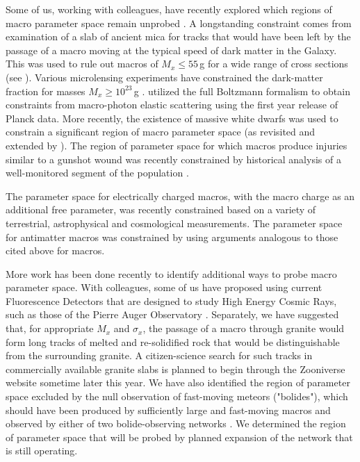 \documentclass[%
 reprint,
 amsmath,amssymb,
 aps,
]{revtex4-2}
\begin{document}
    Some of us, working with colleagues, have recently explored which regions of macro parameter space remain unprobed \cite{jacobs2015macro, jacobs2015resonant, Sidhu2019death, Sidhu2019bolide, Sidhu2020reconsider}. A longstanding constraint comes from examination of a slab of ancient mica for tracks that would have been left by the passage of a macro moving at the typical speed of dark matter in the Galaxy. This was used to rule out macros of $M_x \leq 55\,$g for a wide range of cross sections (see \cite{Price1988ge, DeRujula1984axn, jacobs2015macro}). Various microlensing experiments have constrained the dark-matter fraction  for masses $M_x \geq 10^{23}\,$g \cite{Alcock2001, Griest2013, Tisserand2007, Carr2010,Niikura2019}. \citeauthor{Wilkinson2014angular} \citep{Wilkinson2014angular} utilized the full Boltzmann formalism to obtain constraints from macro-photon elastic scattering using the first year release of Planck data. More recently, the existence of massive white dwarfs was used to constrain a significant region of macro parameter space \cite{Graham2018} (as revisited and extended by \cite{Sidhu2020reconsider}). The region of parameter space for which macros produce injuries similar to a gunshot wound was recently constrained by historical analysis of a well-monitored segment of the population \cite{Sidhu2019death}.

    The parameter space for electrically charged macros, with the macro charge as an additional free parameter, was recently constrained \cite{Sidhu2020charge} based on a variety of terrestrial, astrophysical and cosmological measurements. The parameter space for antimatter macros was constrained by \cite{Sidhu2020anti} using arguments analogous to those cited above for macros.

    More work has been done recently to identify additional ways to probe macro parameter space. With colleagues, some of us have proposed \cite{Sidhu2018auv} using current Fluorescence Detectors that are designed to study High Energy Cosmic Rays, such as those of the Pierre Auger Observatory \cite{Abraham2010}. Separately, we have suggested  \cite{Sidhu2019granite} that, for appropriate $M_x$ and $\sigma_x$, the passage of a macro through granite would form long tracks of melted and re-solidified rock that would be distinguishable from the surrounding granite. A citizen-science search for such tracks in commercially available granite slabs is planned to begin through the Zooniverse website sometime later this year. We have also identified the region of parameter space excluded by the null observation of fast-moving meteors ("bolides"), which should have been produced by sufficiently large and fast-moving macros and observed by either of two  bolide-observing networks \cite{Sidhu2019bolide}. We determined the region of parameter space that will be probed by planned expansion of the network that is still operating.
\end{document}
